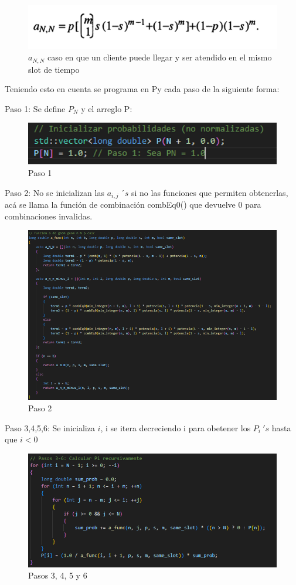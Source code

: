 \documentclass{article}
\begin{document}
\begin{figure}[H]
    \centering
    \includegraphics[width=0.75\linewidth]{images/imageGeoGeoMCalc4.png}
    \caption{$a_{N,N}$ caso en que un cliente puede llegar y ser atendido en el mismo slot de tiempo}
    \label{fig:enter-label}
\end{figure}

Teniendo esto en cuenta se programa en Py cada paso de la siguiente forma:

Paso 1: Se define $P_N$ y el arreglo P:
\begin{figure}[H]
    \centering
    \includegraphics[width=0.75\linewidth]{images/imageGeoGeoMCalc5.png}
    \caption{Paso 1}
    \label{fig:enter-label}
\end{figure}

Paso 2: No se inicializan las $a_{i,j}\ ´s$ si no las funciones que permiten obtenerlas, acá se llama la función de combinación combEq0() que devuelve 0 para combinaciones invalidas.
\begin{figure}[H]
    \centering
    \includegraphics[width=0.75\linewidth]{images/imageGeoGeoMCalc6.png}
    \caption{Paso 2}
    \label{fig:enter-label}
\end{figure}

Paso 3,4,5,6: Se inicializa $i$, i se itera decreciendo i para obetener los $P_i \ 's$ hasta que $i<0$

\begin{figure}[H]
    \centering
    \includegraphics[width=0.75\linewidth]{images/imageGeoGeoMCalc7.png}
    \caption{Pasos 3, 4, 5 y 6}
    \label{fig:enter-label}
\end{figure}
\end{document}
